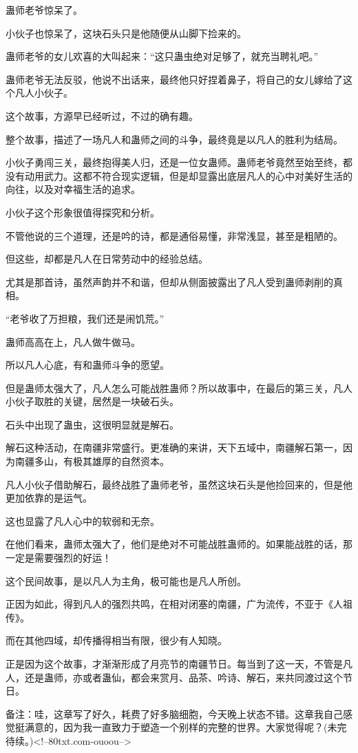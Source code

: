 \begin{this_body}
蛊师老爷惊呆了。

小伙子也惊呆了，这块石头只是他随便从山脚下捡来的。

蛊师老爷的女儿欢喜的大叫起来：“这只蛊虫绝对足够了，就充当聘礼吧。”

蛊师老爷无法反驳，他说不出话来，最终他只好捏着鼻子，将自己的女儿嫁给了这个凡人小伙子。

这个故事，方源早已经听过，不过的确有趣。

整个故事，描述了一场凡人和蛊师之间的斗争，最终竟是以凡人的胜利为结局。

小伙子勇闯三关，最终抱得美人归，还是一位女蛊师。蛊师老爷竟然至始至终，都没有动用武力。这都不符合现实逻辑，但是却显露出底层凡人的心中对美好生活的向往，以及对幸福生活的追求。

小伙子这个形象很值得探究和分析。

不管他说的三个道理，还是吟的诗，都是通俗易懂，非常浅显，甚至是粗陋的。

但这些，却都是凡人在日常劳动中的经验总结。

尤其是那首诗，虽然声韵并不和谐，但却从侧面披露出了凡人受到蛊师剥削的真相。

“老爷收了万担粮，我们还是闹饥荒。”

蛊师高高在上，凡人做牛做马。

所以凡人心底，有和蛊师斗争的愿望。

但是蛊师太强大了，凡人怎么可能战胜蛊师？所以故事中，在最后的第三关，凡人小伙子取胜的关键，居然是一块破石头。

石头中出现了蛊虫，这很明显就是解石。

解石这种活动，在南疆非常盛行。更准确的来讲，天下五域中，南疆解石第一，因为南疆多山，有极其雄厚的自然资本。

凡人小伙子借助解石，最终战胜了蛊师老爷，虽然这块石头是他捡回来的，但是他更加依靠的是运气。

这也显露了凡人心中的软弱和无奈。

在他们看来，蛊师太强大了，他们是绝对不可能战胜蛊师的。如果能战胜的话，那一定是需要强烈的好运！

这个民间故事，是以凡人为主角，极可能也是凡人所创。

正因为如此，得到凡人的强烈共鸣，在相对闭塞的南疆，广为流传，不亚于《人祖传》。

而在其他四域，却传播得相当有限，很少有人知晓。

正是因为这个故事，才渐渐形成了月亮节的南疆节日。每当到了这一天，不管是凡人，还是蛊师，亦或者蛊仙，都会来赏月、品茶、吟诗、解石，来共同渡过这个节日。

备注：哇，这章写了好久，耗费了好多脑细胞，今天晚上状态不错。这章我自己感觉挺满意的，因为我一直致力于塑造一个别样的完整的世界。大家觉得呢？(未完待续。)<!--80txt.com-ouoou-->

\end{this_body}

